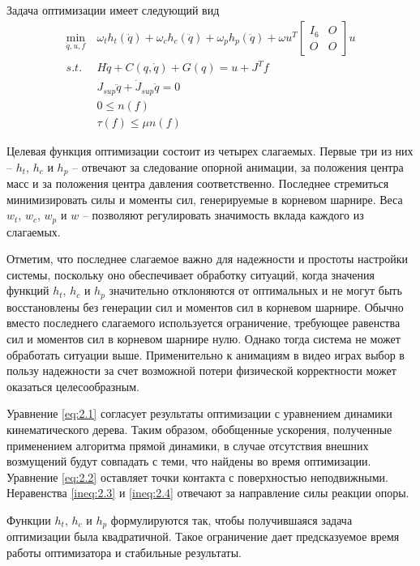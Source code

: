 Задача оптимизации имеет следующий вид
\begin{align*}
  \min_{\ddot{q}, u, f} &\ \omega_{t} h_{t}(\ddot{q}) + \omega_{c} h_{c}(\ddot{q}) + \omega_{p} h_{p}(\ddot{q}) + \omega u^{T} \begin{bmatrix} I_{6} & O \\ O & O \end{bmatrix} u \\
  s.t. &\ H \ddot{q} + C(q, \dot{q}) + G(q) = u + J^{T} f \tag{2.1}\label{eq:2.1} \\
       &\ J_{sup} \ddot{q} + \dot{J}_{sup} \dot{q} = 0 \tag{2.2}\label{eq:2.2} \\
       &\ 0 \le n(f) \tag{2.3}\label{ineq:2.3} \\
       &\ \tau(f) \le \mu n(f) \tag{2.4}\label{ineq:2.4}
\end{align*}

Целевая функция оптимизации состоит из четырех слагаемых. Первые три из них -- $h_{t}$, $h_{c}$ и $h_{p}$ -- отвечают за следование опорной анимации, за положения центра масс и за положения центра давления соответственно. Последнее стремиться минимизировать силы и моменты сил, генерируемые в корневом шарнире. Веса $w_{t}$, $w_{c}$, $w_{p}$ и $w$ -- позволяют регулировать значимость вклада каждого из слагаемых.

Отметим, что последнее слагаемое важно для надежности и простоты настройки системы, поскольку оно обеспечивает обработку ситуаций, когда значения функций $h_{t}$, $h_{c}$ и $h_{p}$ значительно отклоняются от оптимальных и не могут быть восстановлены без генерации сил и моментов сил в корневом шарнире. Обычно вместо последнего слагаемого используется ограничение, требующее равенства сил и моментов сил в корневом шарнире нулю. Однако тогда система не может обработать ситуации выше. Применительно к анимациям в видео играх выбор в пользу надежности за счет возможной потери физической корректности может оказаться целесообразным.

Уравнение \ref{eq:2.1} согласует результаты оптимизации с уравнением динамики кинематического дерева. Таким образом, обобщенные ускорения, полученные применением алгоритма прямой динамики, в случае отсутствия внешних возмущений будут совпадать с теми, что найдены во время оптимизации. Уравнение \ref{eq:2.2} оставляет точки контакта с поверхностью неподвижными. Неравенства \ref{ineq:2.3} и \ref{ineq:2.4} отвечают за направление силы реакции опоры.

Функции $h_{t}$, $h_{c}$ и $h_{p}$ формулируются так, чтобы получившаяся задача оптимизации была квадратичной. Такое ограничение дает предсказуемое время работы оптимизатора и стабильные результаты.

